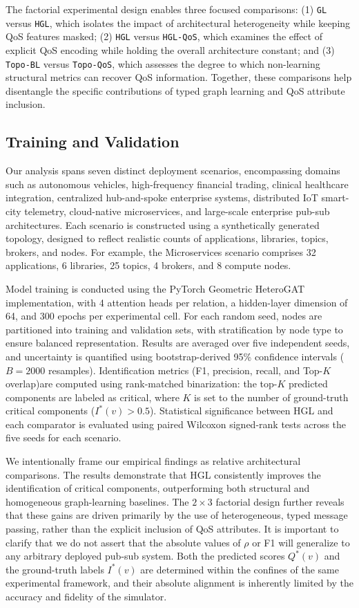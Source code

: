 \documentclass[sigconf,9pt,anonymous]{acmart}
\begin{document}
The factorial experimental design enables three focused comparisons: (1) \texttt{GL} versus \texttt{HGL}, which isolates the impact of architectural heterogeneity while keeping QoS features masked; (2) \texttt{HGL} versus \texttt{HGL-QoS}, which examines the effect of explicit QoS encoding while holding the overall architecture constant; and (3) \texttt{Topo-BL} versus \texttt{Topo-QoS}, which assesses the degree to which non-learning structural metrics can recover QoS information. Together, these comparisons help disentangle the specific contributions of typed graph learning and QoS attribute inclusion.

\subsection{Training and Validation}

Our analysis spans seven distinct deployment scenarios, encompassing domains such as autonomous vehicles, high-frequency financial trading, clinical healthcare integration, centralized hub-and-spoke enterprise systems, distributed IoT smart-city telemetry, cloud-native microservices, and large-scale enterprise pub-sub architectures. Each scenario is constructed using a synthetically generated topology, designed to reflect realistic counts of applications, libraries, topics, brokers, and nodes. For example, the Microservices scenario comprises 32 applications, 6 libraries, 25 topics, 4 brokers, and 8 compute nodes.

Model training is conducted using the PyTorch Geometric HeteroGAT implementation, with 4 attention heads per relation, a hidden-layer dimension of 64, and 300 epochs per experimental cell. For each random seed, nodes are partitioned into training and validation sets, with stratification by node type to ensure balanced representation. Results are averaged over five independent seeds, and uncertainty is quantified using bootstrap-derived 95\% confidence intervals ($B=2000$ resamples). Identification metrics (F1, precision, recall, and Top-$K$ overlap)are computed using rank-matched binarization: the top-$K$ predicted components are labeled as critical, where $K$ is set to the number of ground-truth critical components ($I^*(v)>0.5$). Statistical significance between HGL and each comparator is evaluated using paired Wilcoxon signed-rank tests across the five seeds for each scenario.

We intentionally frame our empirical findings as relative architectural comparisons. The results demonstrate that HGL consistently improves the identification of critical components, outperforming both structural and homogeneous graph-learning baselines. The $2\times3$ factorial design further reveals that these gains are driven primarily by the use of heterogeneous, typed message passing, rather than the explicit inclusion of QoS attributes. It is important to clarify that we do not assert that the absolute values of $\rho$ or F1 will generalize to any arbitrary deployed pub-sub system. Both the predicted scores $Q^*(v)$ and the ground-truth labels $I^*(v)$ are determined within the confines of the same experimental framework, and their absolute alignment is inherently limited by the accuracy and fidelity of the simulator.
\end{document}
